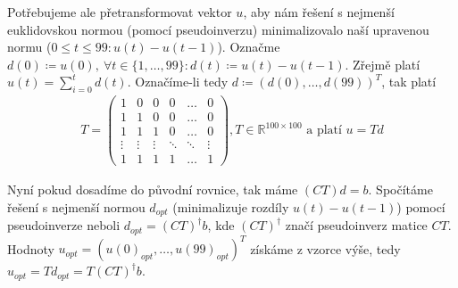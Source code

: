 \documentclass[12pt, a4paper]{article}
\begin{document}
Potřebujeme ale přetransformovat vektor $u$, aby nám řešení s nejmenší euklidovskou normou (pomocí pseudoinverzu) minimalizovalo naší upravenou normu ($0 \leq t \leq 99: u(t)-u(t-1)$). Označme $d(0)\coloneqq u(0),\ \forall t \in \{1,\dots,99\}: d(t) \coloneqq u(t)-u(t-1)$. Zřejmě platí $u(t)=\sum_{i=0}^t d(t)$. Označíme-li tedy $d \coloneqq (d(0),\dots,d(99))^T$, tak platí
\begin{gather*}
T = \begin{pmatrix}
1 & 0 & 0 & 0 & \dots & 0\\
1 & 1 & 0 & 0 & \dots & 0\\
1 & 1 & 1 & 0 & \dots & 0\\
\vdots & \vdots & \vdots & \ddots &\ddots & \vdots\\
1 & 1 & 1 & 1 & \dots & 1
\end{pmatrix}, T \in \mathbb{R}^{100 \times 100} \text{ a platí } u = Td
\end{gather*}

Nyní pokud dosadíme do původní rovnice, tak máme $(CT)d=b$. Spočítáme řešení s nejmenší normou $d_{opt}$ (minimalizuje rozdíly $u(t)-u(t-1)$) pomocí pseudoinverze neboli $d_{opt} = (CT)^{\dagger}b $, kde $(CT)^{\dagger}$ značí pseudoinverz matice $CT$. Hodnoty $u_{opt}=(u(0)_{opt},\dots,u(99)_{opt})^T$ získáme z vzorce výše, tedy $u_{opt}=Td_{opt} = T(CT)^{\dagger}b$.
\end{document}
